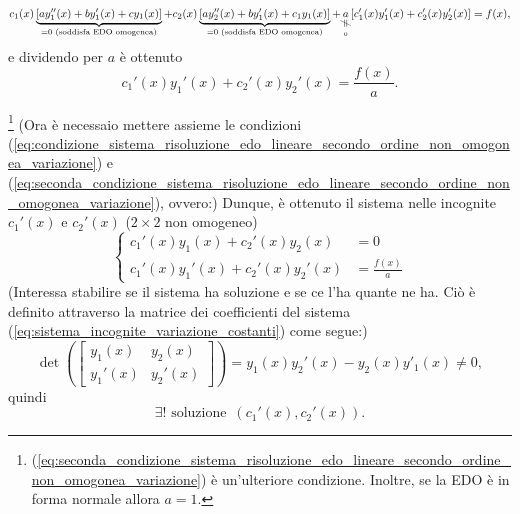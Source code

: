 \begin{equation*}
	c_1(x)\underbrace{[ay_1''(x) + b y_1'(x) + c y_1(x)]}_{ = 0\text{ (soddisfa EDO omogenea)}} + c_2(x) \underbrace{[ay_2''(x) + b y_1'(x) + c_1 y_1(x)]}_{ = 0\text{ (soddisfa EDO omogenea)}} + \underset{\underset{0}{\vertneq}}{a} [c_1'(x) y_1'(x) + c_2'(x)y_2'(x)] = f(x),
\end{equation*}
e dividendo per $a$ è ottenuto
\begin{equation}\label{eq:seconda_condizione_sistema_risoluzione_edo_lineare_secondo_ordine_non_omogonea_variazione}
	c_1'(x) y_1'(x) + c_2'(x) y_2'(x) = \frac{f(x)}{a}.
\end{equation}


\noindent \footnote{(\ref{eq:seconda_condizione_sistema_risoluzione_edo_lineare_secondo_ordine_non_omogonea_variazione}) è un'ulteriore condizione. Inoltre, se la EDO è in forma normale allora $a=1$.} (Ora è necessaio mettere assieme le condizioni (\ref{eq:condizione_sistema_risoluzione_edo_lineare_secondo_ordine_non_omogonea_variazione}) e (\ref{eq:seconda_condizione_sistema_risoluzione_edo_lineare_secondo_ordine_non_omogonea_variazione}), ovvero:) Dunque, è ottenuto il sistema nelle incognite $c_1'(x)$ e $c_2'(x)$ ($2\times 2$ non omogeneo)
\begin{equation}\label{eq:sistema_incognite_variazione_costanti}
	\begin{cases}
		c_1'(x) y_1(x) + c_2'(x) y_2(x) &= 0\\
		c_1'(x) y_1'(x) + c_2'(x) y_2'(x) &= \frac{f(x)}{a}
	\end{cases}
\end{equation}
(Interessa stabilire se il sistema ha soluzione e se ce l'ha quante ne ha. Ciò è definito attraverso la matrice dei coefficienti del sistema (\ref{eq:sistema_incognite_variazione_costanti}) come segue:)
\begin{equation}\label{eq:simil_wronskiana_metodo_variazione_costanti}
	\det\left(\begin{bmatrix}
		y_1(x) & y_2(x)\\
		y_1'(x) & y_2'(x)
	\end{bmatrix}\right) = y_1(x)y_2'(x)- y_2(x) y'_1(x) \neq 0,
\end{equation}
quindi
\begin{equation}\label{eq:soluzione_sistema_condizioni}
	\exists! \text{ soluzione } \, (c_1'(x),c_2'(x)).
\end{equation}


